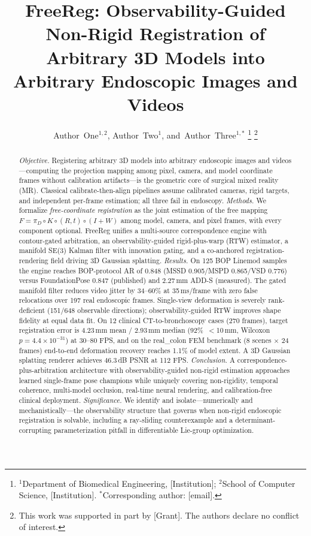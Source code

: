 \documentclass[journal]{IEEEtran}
\title{FreeReg: Observability-Guided Non-Rigid Registration of Arbitrary 3D Models into Arbitrary Endoscopic Images and Videos}
\author{Author~One$^{1,2}$, Author~Two$^{1}$, and~Author~Three$^{1,*}$
\thanks{$^{1}$Department of Biomedical Engineering, [Institution]; $^{2}$School of Computer Science, [Institution]. $^{*}$Corresponding author: [email].}
\thanks{This work was supported in part by [Grant]. The authors declare no conflict of interest.}}
\begin{document}
\maketitle

\begin{abstract}
\emph{Objective.} Registering arbitrary 3D models into arbitrary endoscopic images and videos---computing the projection mapping among pixel, camera, and model coordinate frames without calibration artifacts---is the geometric core of surgical mixed reality (MR). Classical calibrate-then-align pipelines assume calibrated cameras, rigid targets, and independent per-frame estimation; all three fail in endoscopy.
\emph{Methods.} We formalize \emph{free-coordinate registration} as the joint estimation of the free mapping $F=\pi_D\circ K\circ(R,t)\circ(I+W)$ among model, camera, and pixel frames, with every component optional. FreeReg unifies a multi-source correspondence engine with contour-gated arbitration, an observability-guided rigid-plus-warp (RTW) estimator, a manifold SE(3) Kalman filter with innovation gating, and a co-anchored registration-rendering field driving 3D Gaussian splatting.
\emph{Results.} On 125 BOP Linemod samples the engine reaches BOP-protocol AR of 0.848 (MSSD 0.905/MSPD 0.865/VSD 0.776) versus FoundationPose 0.847 (published) and 2.27\,mm ADD-S (measured). The gated manifold filter reduces video jitter by 34--60\% at 35\,ms/frame with zero false relocations over 197 real endoscopic frames. Single-view deformation is severely rank-deficient (151/648 observable directions); observability-guided RTW improves shape fidelity at equal data fit. On 12 clinical CT-to-bronchoscopy cases (270 frames), target registration error is 4.23\,mm mean / 2.93\,mm median (92\%\ $<$10\,mm, Wilcoxon $p=4.4\times10^{-31}$) at 30--80 FPS, and on the real\_colon FEM benchmark (8 scenes $\times$ 24 frames) end-to-end deformation recovery reaches 1.1\% of model extent. A 3D Gaussian splatting renderer achieves 46.3\,dB PSNR at 112 FPS.
\emph{Conclusion.} A correspondence-plus-arbitration architecture with observability-guided non-rigid estimation approaches learned single-frame pose champions while uniquely covering non-rigidity, temporal coherence, multi-model occlusion, real-time neural rendering, and calibration-free clinical deployment.
\emph{Significance.} We identify and isolate---numerically and mechanistically---the observability structure that governs when non-rigid endoscopic registration is solvable, including a ray-sliding counterexample and a determinant-corrupting parameterization pitfall in differentiable Lie-group optimization.
\end{abstract}
\end{document}
